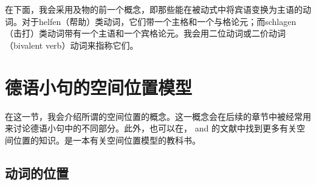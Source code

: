 在下面，我会采用及物的前一个概念，即那些能在被动式中将宾语变换为主语的动词。对于helfen（帮助）类动词，它们带一个主格和一个与格论元；而schlagen（击打）类动词带有一个主语和一个宾格论元。我会用二位动词或二价动词（bivalent verb）动词来指称它们。

\section{德语小句的空间位置模型}
\label{sec-topo}
\label{Abschnitt-Toplogie}

%
在这一节，我会介绍所谓的空间位置的概念。这一概念会在后续的章节中被经常用来讨论德语小句中的不同部分。此外，也可以在， and 的文献中找到更多有关空间位置的知识。是一本有关空间位置模型的教科书。

\subsection{动词的位置}

